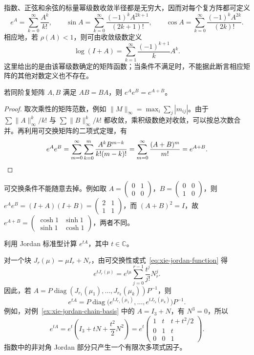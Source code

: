 指数、正弦和余弦的标量幂级数收敛半径都是无穷大，因而对每个复方阵都可定义
\begin{equation}
\label{eq:xie-exp-sin-cos}
    e^A=\sum_{k=0}^{\infty}\frac{A^k}{k!},\qquad
    \sin A=\sum_{k=0}^{\infty}\frac{(-1)^kA^{2k+1}}{(2k+1)!},\qquad
    \cos A=\sum_{k=0}^{\infty}\frac{(-1)^kA^{2k}}{(2k)!}.
\end{equation}
相应地，若 $\rho(A)<1$，则可由收敛级数定义
\[
    \log(I+A)=\sum_{k=1}^{\infty}\frac{(-1)^{k+1}}{k}A^k.
\]
这里给出的是由该幂级数确定的矩阵函数；当条件不满足时，不能据此断言相应矩阵的其他对数定义也不存在。

\begin{proposition}
\label{prop:xie-commuting-exponentials}
若同阶复矩阵 $A,B$ 满足 $AB=BA$，则 $e^Ae^B=e^{A+B}$。
\end{proposition}
\begin{proof}
取次乘性的矩阵范数，例如 $\|M\|_\infty=\max_i\sum_j|m_{ij}|$。由于 $\sum\|A\|_\infty^k/k!$ 与 $\sum\|B\|_\infty^k/k!$ 都收敛，乘积级数绝对收敛，可以按总次数合并。再利用可交换矩阵的二项式定理，有
\[
    e^Ae^B
    =\sum_{m=0}^{\infty}\sum_{k=0}^m\frac{A^kB^{m-k}}{k!(m-k)!}
    =\sum_{m=0}^{\infty}\frac{(A+B)^m}{m!}
    =e^{A+B}.\qedhere
\]
\end{proof}

可交换条件不能随意去掉。例如取 $A=\begin{pmatrix}0&1\\0&0\end{pmatrix}$，$B=\begin{pmatrix}0&0\\1&0\end{pmatrix}$，则 $e^Ae^B=(I+A)(I+B)=\begin{pmatrix}2&1\\1&1\end{pmatrix}$，而 $(A+B)^2=I$，故 $e^{A+B}=\begin{pmatrix}\cosh1&\sinh1\\\sinh1&\cosh1\end{pmatrix}$，两者不同。

\begin{example}
\label{ex:xie-jordan-exponential}
利用 Jordan 标准型计算 $e^{tA}$，其中 $t\in\mathbb C$。
\end{example}
\begin{solve}
对一个块 $J_r(\mu)=\mu I_r+N_r$，由可交换性或式~\eqref{eq:xie-jordan-function} 得
\begin{equation}
\label{eq:xie-jordan-exponential}
    e^{tJ_r(\mu)}=e^{t\mu}\sum_{j=0}^{r-1}\frac{t^j}{j!}N_r^j.
\end{equation}
因此，若 $A=P\operatorname{diag}(J_{r_1}(\mu_1),\ldots,J_{r_k}(\mu_k))P^{-1}$，则
\[
    e^{tA}=P\operatorname{diag}\bigl(e^{tJ_{r_1}(\mu_1)},\ldots,e^{tJ_{r_k}(\mu_k)}\bigr)P^{-1}.
\]
例如，对例~\ref{ex:xie-jordan-chain-basis} 中的 $A=I_3+N$，有 $N^3=0$，所以
\[
    e^{tA}=e^t\left(I_3+tN+\frac{t^2}{2}N^2\right)
    =e^t\begin{pmatrix}1&t&t+t^2/2\\0&1&t\\0&0&1\end{pmatrix}.
\]
指数中的非对角 Jordan 部分只产生一个有限次多项式因子。
\end{solve}

